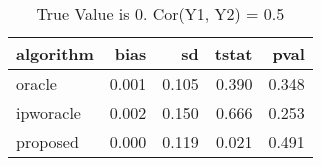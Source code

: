 \begin{table}[h!]
\caption{True Value is 0. Cor(Y1, Y2) = 0.5}
\centering
\begin{tabular}[t]{lrrrr}
\toprule
algorithm & bias & sd & tstat & pval\\
\midrule
oracle & 0.001 & 0.105 & 0.390 & 0.348\\
ipworacle & 0.002 & 0.150 & 0.666 & 0.253\\
proposed & 0.000 & 0.119 & 0.021 & 0.491\\
\bottomrule
\end{tabular}
\end{table}
